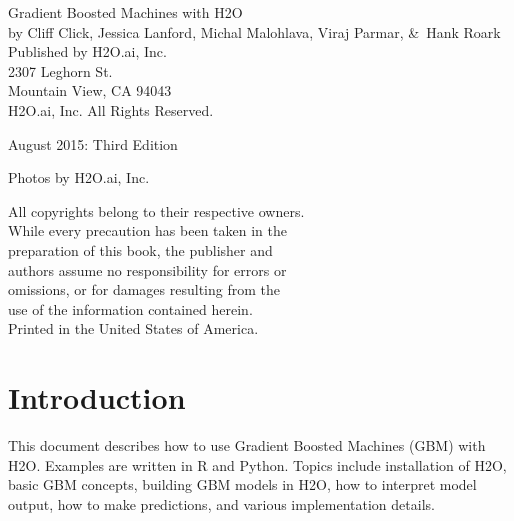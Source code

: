 {\raggedright 

Gradient Boosted Machines with H2O\\
  by Cliff Click, Jessica Lanford, Michal Malohlava, Viraj Parmar, \&\  Hank Roark\\
\bigskip
  Published by H2O.ai, Inc. \\
2307 Leghorn St. \\
Mountain View, CA 94043\\
\bigskip
{} H2O.ai, Inc. All Rights Reserved. 
\bigskip

August 2015: Third Edition
\bigskip

Photos by \textcopyright H2O.ai, Inc.
\bigskip

All copyrights belong to their respective owners.\\
While every precaution has been taken in the\\
preparation of this book, the publisher and\\
authors assume no responsibility for errors or\\
omissions, or for damages resulting from the\\
use of the information contained herein.\\
\bigskip
Printed in the United States of America. 
}


\newpage
\thispagestyle{empty}%

\tableofcontents


\newpage

\section{Introduction}
This document describes how to use Gradient Boosted Machines (GBM) with H2O.  
Examples are written in R and Python.
Topics include installation of H2O, basic GBM concepts, building GBM models in H2O, how to
interpret model output, how to make predictions, and various implementation details.




\newcommand{\waterVersion}{3.0.1.4}

